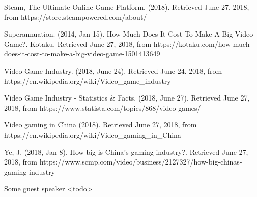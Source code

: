 \documentclass[10pt,letterpaper]{article}
\begin{document}
\begin{thebibliography}{}
	Steam, The Ultimate Online Game Platform. (2018). Retrieved June 27, 2018, from https://store.steampowered.com/about/

	Superannuation. (2014, Jan 15). How Much Does It Cost To Make A Big Video Game?. Kotaku. Retrieved June 27, 2018, from https://kotaku.com/how-much-does-it-cost-to-make-a-big-video-game-1501413649

	Video Game Industry. (2018, June 24). Retrieved June 24. 2018, from https://en.wikipedia.org/wiki/Video\_game\_industry

	Video Game Industry - Statistics \& Facts. (2018, June 27). Retrieved June 27, 2018, from https://www.statista.com/topics/868/video-games/

	Video gaming in China (2018). Retrieved June 27, 2018, from https://en.wikipedia.org/wiki/Video\_gaming\_in\_China

	Ye, J. (2018, Jan 8). How big is China's gaming industry?. Retrieved June 27, 2018, from https://www.scmp.com/video/business/2127327/how-big-chinas-gaming-industry

	Some guest speaker <todo>

\end{thebibliography}
\end{document}
